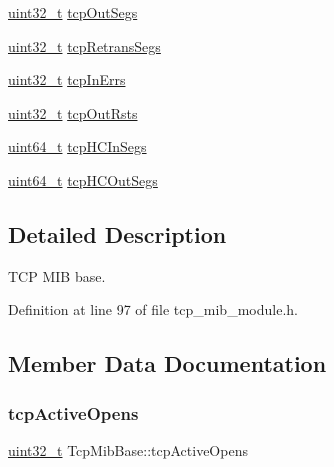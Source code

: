 \begin{DoxyCompactItemize}
\item 
\hyperlink{stdint_8h_a435d1572bf3f880d55459d9805097f62}{uint32\+\_\+t} \hyperlink{structTcpMibBase_a2255475e50c86d6f18a0b1a37bd7b42b}{tcp\+Out\+Segs}
\item 
\hyperlink{stdint_8h_a435d1572bf3f880d55459d9805097f62}{uint32\+\_\+t} \hyperlink{structTcpMibBase_a1d65ad5ffcd9d4b6817edb95ad965427}{tcp\+Retrans\+Segs}
\item 
\hyperlink{stdint_8h_a435d1572bf3f880d55459d9805097f62}{uint32\+\_\+t} \hyperlink{structTcpMibBase_a871f4a891f8b0334a9387605c39448c0}{tcp\+In\+Errs}
\item 
\hyperlink{stdint_8h_a435d1572bf3f880d55459d9805097f62}{uint32\+\_\+t} \hyperlink{structTcpMibBase_a60c89da35e9b3927b1ae110af0e2a430}{tcp\+Out\+Rsts}
\item 
\hyperlink{stdint_8h_aec6fcb673ff035718c238c8c9d544c47}{uint64\+\_\+t} \hyperlink{structTcpMibBase_a11fe74994b0d0ec594f6ccd9267e9131}{tcp\+H\+C\+In\+Segs}
\item 
\hyperlink{stdint_8h_aec6fcb673ff035718c238c8c9d544c47}{uint64\+\_\+t} \hyperlink{structTcpMibBase_a42818f70ab96e3ba1f29c52291a2125f}{tcp\+H\+C\+Out\+Segs}
\end{DoxyCompactItemize}


\subsection{Detailed Description}
T\+CP M\+IB base. 

Definition at line 97 of file tcp\+\_\+mib\+\_\+module.\+h.



\subsection{Member Data Documentation}
\mbox{\label{structTcpMibBase_a1a0cc6f5cbef4ad3c3b4fd04d35ad4b5}} 
\subsubsection{\texorpdfstring{tcp\+Active\+Opens}{tcpActiveOpens}}
{\footnotesize\ttfamily \hyperlink{stdint_8h_a435d1572bf3f880d55459d9805097f62}{uint32\+\_\+t} Tcp\+Mib\+Base\+::tcp\+Active\+Opens}



